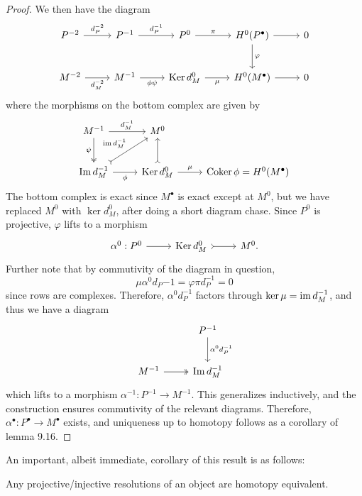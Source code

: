 \begin{proof}
	We then have the diagram
	\[\begin{tikzcd}[row sep = 2.5em, column sep = 2.5em]
		P^{-2} \ar[r, "d_P^{-2} "]&P ^{-1} \ar[r, "d_P ^{-1} "]&P^0\ar[r, "\pi "]&H^0(P^{\bullet} )\ar[d, "\varphi "]\ar[r]&0\\
		M^{-2} \ar[r, "d_M^{-2} "']&M^{-1} \ar[r, "\phi \psi "']&\Ker d_M^0\ar[r, "\mu "']&H^0(M^{\bullet} )\ar[r]&0
	\end{tikzcd}\]
	where the morphisms on the bottom complex are given by
	\[\begin{tikzcd}[row sep = 2.5em, column sep = 2.5em]
		M^{-1} \ar[r, "d_M^{-1} "]\ar[d, "\psi "', two heads]&M^0\\
		\Im d_M^{-1} \ar[ur, tail, "\im d_M^{-1} "]\ar[r, "\phi "']&\Ker d_M^0\ar[u, tail]\ar[r, "\mu "]&\operatorname{Coker} \phi =H^0(M^{\bullet} )
	\end{tikzcd}\]
	The bottom complex is exact since $M^{\bullet} $ is exact except at $M^0$, but we have replaced $M^0$ with $\ker d_M^0$, after doing a short diagram chase. Since $P^0$ is projective, $\varphi $ lifts to a morphism
	\[\begin{tikzcd}[row sep = 2.5em, column sep = 2.5em]
		\alpha ^0:P^0\ar[r]&\Ker d_M^0\ar[r, tail]&M^0.
	\end{tikzcd}\]
	Further note that by commutivity of the diagram in question,
	\[
		\mu \alpha ^0d_P{-1} =\varphi \pi d_P ^{-1} =0
	\]
	since rows are complexes. Therefore, $\alpha ^0d_P ^{-1} $ factors through $\ker \mu =\operatorname{im} d_M^{-1} $, and thus we have a diagram
	\[\begin{tikzcd}[row sep = 2.5em, column sep = 2.5em]
		&P ^{-1} \ar[d, "\alpha ^0 d_P ^{-1} "]\\
		M^{-1} \ar[r, two heads]&\Im d_M^{-1} 
	\end{tikzcd}\]
	which lifts to a morphism $\alpha ^{-1} : P ^{-1}  \to M^{-1} $. This generalizes inductively, and the construction ensures commutivity of the relevant diagrams. Therefore, $\alpha ^{\bullet} : P^{\bullet}  \to M^{\bullet} $ exists, and uniqueness up to homotopy follows as a corollary of lemma 9.16.
\end{proof}

An important, albeit immediate, corollary of this result is as follows:
\begin{proposition}\label{prp:9.6.1}
	Any projective/injective resolutions of an object are homotopy equivalent.
\end{proposition}

